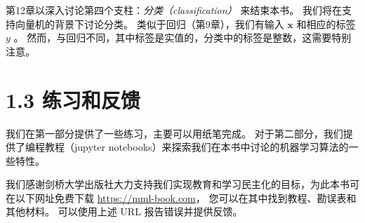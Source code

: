 第12章以深入讨论第四个支柱：\emph{分类（classification）} 来结束本书。 我们将在支持向量机的背景下讨论分类。 类似于回归（第9章），我们有输入 $ \boldsymbol{x} $ 和相应的标签 $ y $ 。 然而，与回归不同，其中标签是实值的，分类中的标签是整数，这需要特别注意。

\section*{1.3 练习和反馈}
\label{sec:1.3}

我们在第一部分提供了一些练习，主要可以用纸笔完成。 对于第二部分，我们提供了编程教程（jupyter notebooks）来探索我们在本书中讨论的机器学习算法的一些特性。

我们感谢剑桥大学出版社大力支持我们实现教育和学习民主化的目标，为此本书可在以下网址免费下载 \href{https://mml-book.com}{https://mml-book.com}， 您可以在其中找到教程、勘误表和其他材料。 可以使用上述 URL 报告错误并提供反馈。
